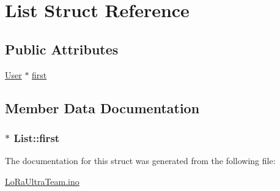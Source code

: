 \hypertarget{struct_list}{}\section{List Struct Reference}
\label{struct_list}
\subsection*{Public Attributes}
\begin{DoxyCompactItemize}
\item 
\hyperlink{struct_user}{User} $\ast$ \hyperlink{struct_list_a486a1c794ef6d3c71177c242d456ce21}{first}
\end{DoxyCompactItemize}


\subsection{Member Data Documentation}
\subsubsection[{\texorpdfstring{first}{first}}]{$\ast$ List\+::first}\hypertarget{struct_list_a486a1c794ef6d3c71177c242d456ce21}{}\label{struct_list_a486a1c794ef6d3c71177c242d456ce21}


The documentation for this struct was generated from the following file\+:\begin{DoxyCompactItemize}
\item 
\hyperlink{_lo_ra_ultra_team_8ino}{Lo\+Ra\+Ultra\+Team.\+ino}\end{DoxyCompactItemize}
